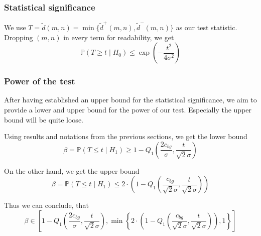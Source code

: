 \documentclass{beamer}
\begin{document}
\begin{frame}
	\subsubsection{Statistical significance}
	We use $T = \tilde{d}(m, n) = \min \{ \tilde{d}^+(m, n), \tilde{d}^-(m, n) \}$ as our test statistic. Dropping $(m, n)$ in every term for readability, we get
	\begin{equation*}
		\mathbb{P}(T \geq t \mid H_0) \leq \exp \left( - \frac{t^2}{4 \sigma^2} \right)
	\end{equation*}
\end{frame}

\begin{frame}
	\subsubsection{Power of the test}
	After having established an upper bound for the statistical significance, we aim to provide a lower and upper bound for the power of our test. Especially the upper bound will be quite loose.
	
	Using results and notations from the previous sections, we get the lower bound
	\begin{equation*}
		\beta = \mathbb{P}(T \leq t \mid H_1) \geq 1 - Q_1 \left( \frac{2 c_{bg}}{\sigma}, \frac{t}{\sqrt{2} \sigma} \right)
	\end{equation*}
	
	On the other hand, we get the upper bound
	\begin{equation*}
		\beta = \mathbb{P}(T \leq t \mid H_1) \leq 2 \cdot \left( 1 - Q_1 \left( \frac{c_{bg}}{\sqrt{2} \sigma}, \frac{t}{\sqrt{2} \sigma} \right) \right)
	\end{equation*}
	
	Thus we can conclude, that
	\begin{equation*}
		\beta \in \left[ 1 - Q_1 \left( \frac{2 c_{bg}}{\sigma}, \frac{t}{\sqrt{2} \sigma} \right), \min \left\{ 2 \cdot \left( 1 - Q_1 \left( \frac{c_{bg}}{\sqrt{2} \sigma}, \frac{t}{\sqrt{2} \sigma} \right) \right), 1 \right\} \right]
	\end{equation*}
\end{frame}
\end{document}
